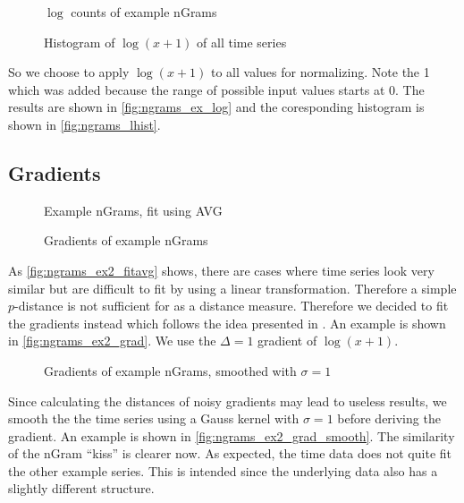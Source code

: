 \begin{figure}
    \centering
    
    \caption{$\log$ counts of example nGrams}
    \label{fig:ngrams_ex_log}
\end{figure}

\begin{figure}
    \centering
    
    \caption{Histogram of $\log(x + 1)$ of all time series}
    \label{fig:ngrams_lhist}
\end{figure}

So we choose to apply $\log(x + 1)$ to all values for normalizing. Note the \num{1} which was added because the range of possible input values starts at \num{0}. The results are shown in \autoref{fig:ngrams_ex_log} and the coresponding histogram is shown in \autoref{fig:ngrams_lhist}.


\subsection{Gradients}
\label{ssec:baseline:sim:grad}

\begin{figure}
    \centering
    
    \caption{Example nGrams, fit using AVG}
    \label{fig:ngrams_ex2_fitavg}
\end{figure}

\begin{figure}
    \centering
    
    \caption{Gradients of example nGrams}
    \label{fig:ngrams_ex2_grad}
\end{figure}

As \autoref{fig:ngrams_ex2_fitavg} shows, there are cases where time series look very similar but are difficult to fit by using a linear transformation. Therefore a simple $p$-distance is not sufficient for as a distance measure. Therefore we decided to fit the gradients instead which follows the idea presented in \cite{DDTW}. An example is shown in \autoref{fig:ngrams_ex2_grad}. We use the $\Delta = 1$ gradient of $\log(x + 1)$.

\begin{figure}
    \centering
    
    \caption{Gradients of example nGrams, smoothed with $\sigma = 1$}
    \label{fig:ngrams_ex2_grad_smooth}
\end{figure}

Since calculating the distances of noisy gradients may lead to useless results, we smooth the the time series using a Gauss kernel with $\sigma = 1$ before deriving the gradient. An example is shown in \autoref{fig:ngrams_ex2_grad_smooth}. The similarity of the nGram \enquote{kiss} is clearer now. As expected, the time data does not quite fit the other example series. This is intended since the underlying data also has a slightly different structure.


